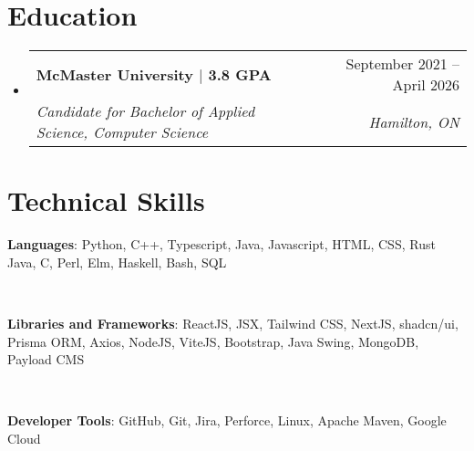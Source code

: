 \documentclass[letterpaper,11pt]{article}
\makeatletter
\newcommand{\resumeSubheading}[4]{
  \vspace{-2pt}\item
    \begin{tabular*}{0.97\textwidth}[t]{l@{\extracolsep{\fill}}r}
      \textbf{#1} & #2 \\
      \textit{\small#3} & \textit{\small #4} \\
    \end{tabular*}\vspace{-7pt}
}
\newcommand{\resumeDatedList}[2]{
    \vspace{-2pt}\item
    \begin{tabular*}{0.97\textwidth}[t]{l@{\extracolsep{\fill}}r}
        #1 & #2 \\
    \end{tabular*}
}
\newcommand{\resumeListItem}[1]{
    \vspace{-2pt}\item#1
}
\newcommand{\resumeSubHeadingListStart}{\begin{itemize}[leftmargin=0.15in, label={}]}
\newcommand{\resumeSubHeadingListEnd}{\end{itemize}}
\newcommand{\resumeListStart}{\begin{itemize}[itemindent=-0.33in,leftmargin=0.48in, label={}]}
\newcommand{\resumeListEnd}{\end{itemize}}
\makeatother
\begin{document}
\section{Education}
\resumeSubHeadingListStart
\resumeSubheading
{McMaster University $|$ 3.8 GPA}{September 2021 -- April 2026}
{Candidate for Bachelor of Applied Science, Computer Science}{Hamilton, ON}
\resumeSubHeadingListEnd

%
\section{Technical Skills}
\resumeListStart\small{
	\resumeListItem{\textbf{Languages}:
		Python, C++, Typescript, Java, Javascript, HTML, CSS, Rust Java, C, Perl, Elm, Haskell, Bash, SQL
	} \\
	\resumeListItem{\textbf{Libraries and Frameworks}:
		ReactJS, JSX, Tailwind CSS, NextJS, shadcn/ui, Prisma ORM, Axios, NodeJS, ViteJS, Bootstrap, Java Swing, MongoDB, Payload CMS
	} \\
	\resumeListItem{\textbf{Developer Tools}:
		GitHub, Git, Jira, Perforce, Linux, Apache Maven, Google Cloud
	} \\
} \resumeListEnd


%

\end{document}
